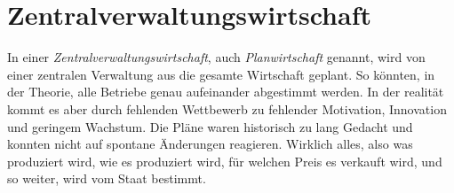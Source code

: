 \documentclass{article}
\begin{document}
 
 
\section{Zentralverwaltungswirtschaft}
In einer \emph{Zentralverwaltungswirtschaft}, auch \emph{Planwirtschaft} genannt, wird von einer zentralen Verwaltung aus die gesamte Wirtschaft geplant. So könnten, in der Theorie, alle Betriebe genau aufeinander abgestimmt werden. In der realität kommt es aber durch fehlenden Wettbewerb zu fehlender Motivation, Innovation und geringem Wachstum. Die Pläne waren historisch zu lang Gedacht und konnten nicht auf spontane Änderungen reagieren. \newline
Wirklich alles, also was produziert wird, wie es produziert wird, für welchen Preis es verkauft wird, und so weiter, wird vom Staat bestimmt. 
 
\end{document}
